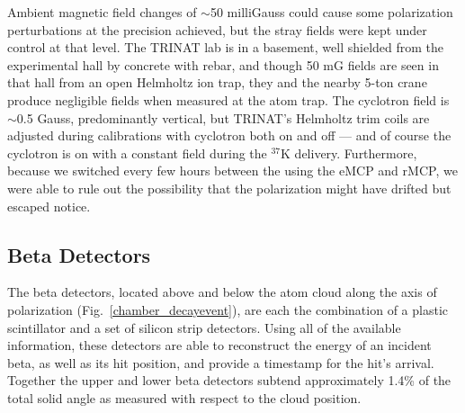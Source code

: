 
Ambient magnetic field changes of $\sim$50 milliGauss could cause some polarization perturbations at the precision achieved, but the stray fields were kept under control at that level.  The TRINAT lab is in a basement, well shielded from the experimental hall by concrete with rebar, and though 50 mG fields are seen in that hall from an open Helmholtz ion trap, they and the nearby 5-ton crane produce negligible fields when measured at the atom trap. The cyclotron field is $\sim$0.5 Gauss, predominantly vertical, 
but TRINAT's Helmholtz trim coils are adjusted during calibrations with cyclotron both on and off --- and of course the cyclotron is on with a constant field during the $^{37}$K delivery.  Furthermore, because we switched every few hours between the using the eMCP and rMCP, we were able to rule out the possibility that the polarization might have drifted but escaped notice.  

\subsection{Beta Detectors}
\label{section:betadetectors}
The beta detectors, located above and below the atom cloud along the axis of polarization (Fig.~\ref{chamber_decayevent}), are each the combination of a plastic scintillator and a set of silicon strip detectors.  Using all of the available information, these detectors are able to reconstruct the energy of an incident beta, as well as its hit position, and provide a timestamp for the hit's arrival.  Together the upper and lower beta detectors subtend approximately 1.4\% of the total solid angle as measured with respect to the cloud position. 

